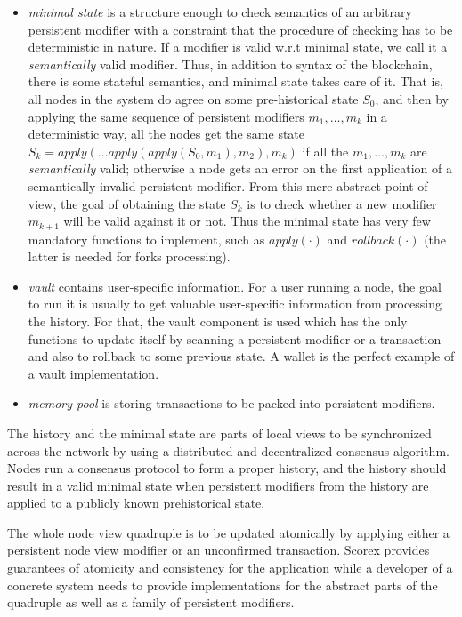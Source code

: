 \begin{itemize}
\item{\em minimal state} is a structure enough to check semantics of an arbitrary persistent modifier with a constraint that the procedure of checking has to be deterministic in nature. If a modifier is valid w.r.t minimal state, we call it a {\em semantically} valid modifier.
Thus, in addition to syntax of the blockchain, there is some stateful semantics, and minimal state takes care of it. That is, all nodes in the system do agree on some pre-historical state $S_0$, and then by applying the same sequence of persistent modifiers $m_1, \ldots, m_k$ in a deterministic way, all the nodes get the same state $S_k = apply(\ldots apply(apply(S_0, m_1), m_2), m_k)$ if all the $m_1, \ldots, m_k$ are {\em semantically} valid; otherwise a node gets an error on the first application of a semantically invalid persistent modifier. From this mere abstract point of view, the goal of obtaining the state $S_k$ is to check whether a new modifier $m_{k+1}$ will be valid against it or not. Thus the minimal state has very few mandatory functions to implement, such as $apply(\cdot)$ and $rollback(\cdot)$ (the latter is needed for forks processing).

\item{\em vault} contains user-specific information. For a user running a node, the goal to run it is usually to get valuable user-specific information from processing the history. For that, the vault component is used which has the only functions to update itself by scanning a persistent modifier or a transaction and also to rollback to some previous state. A wallet is the perfect example of a vault implementation. 

\item{\em memory pool} is storing transactions to be packed into persistent modifiers.
\end{itemize}

The history and the minimal state are parts of local views to be synchronized across the network by using a distributed and decentralized consensus algorithm. Nodes run a consensus protocol to form a proper history, and the history should result in a valid minimal state when persistent modifiers from the history are applied to a publicly known prehistorical state.

The whole node view quadruple is to be updated atomically by applying either a persistent node view modifier or an unconfirmed transaction. Scorex provides guarantees of atomicity and consistency for the application while a developer of a concrete system needs to provide implementations for the abstract parts of the quadruple as well as a family of persistent modifiers.

